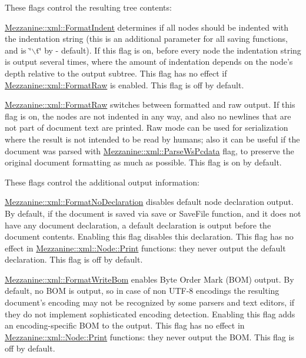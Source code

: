 These flags control the resulting tree contents:
\begin{DoxyItemize}
\item \hyperlink{namespaceMezzanine_1_1xml_a70e77a101c278236eeb7eb3c40f56184}{Mezzanine::xml::FormatIndent} determines if all nodes should be indented with the indentation string (this is an additional parameter for all saving functions, and is \char`\"{}$\backslash$t\char`\"{} by -\/ default). If this flag is on, before every node the indentation string is output several times, where the amount of indentation depends on the node's depth relative to the output subtree. This flag has no effect if \hyperlink{namespaceMezzanine_1_1xml_a92396af17ca2c698180d7394362b9a70}{Mezzanine::xml::FormatRaw} is enabled. This flag is off by default.
\item \hyperlink{namespaceMezzanine_1_1xml_a92396af17ca2c698180d7394362b9a70}{Mezzanine::xml::FormatRaw} switches between formatted and raw output. If this flag is on, the nodes are not indented in any way, and also no newlines that are not part of document text are printed. Raw mode can be used for serialization where the result is not intended to be read by humans; also it can be useful if the document was parsed with \hyperlink{namespaceMezzanine_1_1xml_ad1540f35280d1c679102542125ed94ac}{Mezzanine::xml::ParseWsPcdata} flag, to preserve the original document formatting as much as possible. This flag is on by default.
\end{DoxyItemize}

These flags control the additional output information:
\begin{DoxyItemize}
\item \hyperlink{namespaceMezzanine_1_1xml_a24412cfad59b402e85cbe6ad5093917a}{Mezzanine::xml::FormatNoDeclaration} disables default node declaration output. By default, if the document is saved via save or SaveFile function, and it does not have any document declaration, a default declaration is output before the document contents. Enabling this flag disables this declaration. This flag has no effect in \hyperlink{classMezzanine_1_1xml_1_1Node_a94b9b66aff6d1d6a26c1dd5949fabb25}{Mezzanine::xml::Node::Print} functions: they never output the default declaration. This flag is off by default.
\item \hyperlink{namespaceMezzanine_1_1xml_a984338522c305d986b8fa5a3818bf338}{Mezzanine::xml::FormatWriteBom} enables Byte Order Mark (BOM) output. By default, no BOM is output, so in case of non UTF-\/8 encodings the resulting document's encoding may not be recognized by some parsers and text editors, if they do not implement sophisticated encoding detection. Enabling this flag adds an encoding-\/specific BOM to the output. This flag has no effect in \hyperlink{classMezzanine_1_1xml_1_1Node_a94b9b66aff6d1d6a26c1dd5949fabb25}{Mezzanine::xml::Node::Print} functions: they never output the BOM. This flag is off by default.
\end{DoxyItemize}


